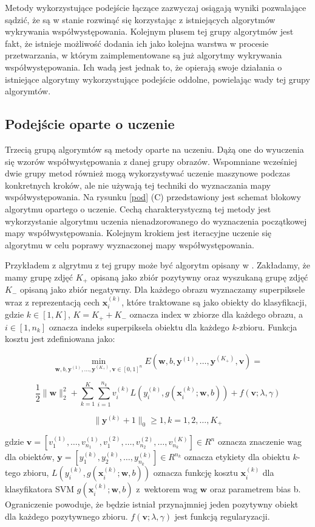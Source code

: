 \documentclass[a4paper,11pt, notitlepage, twosides, openany ]{report}
\begin{document}
	Metody wykorzystujące podejście łączące zazwyczaj osiągają wyniki pozwalające sądzić, że są w stanie rozwinąć się korzystając z istniejących algorytmów wykrywania współwystępowania. Kolejnym plusem tej grupy algorytmów jest fakt, że istnieje możliwość dodania ich jako kolejna warstwa w procesie przetwarzania, w którym zaimplementowane są już algorytmy wykrywania współwystępowania. Ich wadą jest jednak to, że opierają swoje działania o istniejące algorytmy wykorzystujące podejście oddolne, powielając wady tej grupy algorymtów.

	\subsection{Podejście oparte o uczenie}
	Trzecią grupą algorymtów są metody oparte na uczeniu. Dążą one do wyuczenia się wzorów współwystępowania z danej grupy obrazów. Wspomniane wcześniej dwie grupy metod również mogą wykorzystywać uczenie maszynowe podczas konkretnych kroków, ale nie używają tej techniki do wyznaczania mapy współwystępowania. Na rysunku \ref{pod} (C) przedstawiony jest schemat blokowy algorytmu opartego o uczenie. Cechą charakterystyczną tej metody jest wykorzystanie algorytmu uczenia nienadzorowanego do wyznaczenia początkowej mapy współwystępowania. Kolejnym krokiem jest iteracyjne uczenie się algorytmu w celu poprawy wyznaczonej mapy współwystępowania.

	Przykładem z algrytmu z tej grupy może być algorytm opisany w \cite{10.1109/TPAMI.2016.2567393}. Zakładamy, że mamy grupę zdjęć $K_+$ opisaną jako zbiór pozytywny oraz wyszukaną grupę zdjęć $K_-$ opisaną jako zbiór negatywny. Dla każdego obrazu wyznaczamy superpiksele wraz z reprezentacją cech $\mathbf{x}_i^{(k)}$, które traktowane są jako obiekty do klasyfikacji, gdzie $k \in [1, K]$, $K=K_+ + K_-$ oznacza index w zbiorze dla każdego obrazu, a $i \in [1, n_k]$ oznacza indeks superpiksela obiektu dla każdego $k$-zbioru. Funkcja kosztu jest zdefiniowana jako:

	$$
		\min_{\mathbf{w},b,\mathbf{y}^{(1)}, \dots, \mathbf{y}^{(K_+)},\mathbf{v}\in[0,1]^n} E(\mathbf{w},b,\mathbf{y}^{(1)}, \dots, \mathbf{y}^{(K_+)},\mathbf{v}) = 
	$$

	$$
	\frac{1}{2} \|\mathbf{w}\|^2_2 + \sum_{k=1}^K \sum_{i=1}^{n_k}v_i^{(k)} L(y_i^{(k)}, g(\mathbf{x}^{(k)}_i;\mathbf{w},b)) + f(\mathbf{v};\lambda, \gamma)
	$$

	$$
	\|\mathbf{y}^{(k)}+1\|_0 \geq 1, k=1,2,\dots,K_+
	$$

	gdzie $\mathbf{v} = [v_1^{(1)}, \dots, v_{n_1}^{(1)}, v_{1}^{(2)}, \dots, v_{n_2}^{(2)}, \dots, v_{n_k}^{(K)}] \in R^{n}$ oznacza znaczenie wag dla obiektów, $\mathbf{y} = [y_1^{(k)}, y_{2}^{(k)}, \dots, y_{n_k}^{(k)}] \in R^{n_k}$ oznacza etykiety dla obiektu $k$-tego zbioru, $L(y_i^{(k)}, g(\mathbf{x}^{(k)}_i;\mathbf{w},b))$ oznacza funkcję kosztu $\mathbf{x}_i^{(k)}$ dla klasyfikatora SVM $g(\mathbf{x}^{(k)}_i;\mathbf{w},b)$ z~wektorem wag $\mathbf{w}$ oraz parametrem bias b. Ograniczenie powoduje, że będzie istniał przynajmniej jeden pozytywny obiekt dla każdego pozytywnego zbioru. $f(\mathbf{v};\lambda, \gamma)$ jest funkcją regularyzacji.
\end{document}
